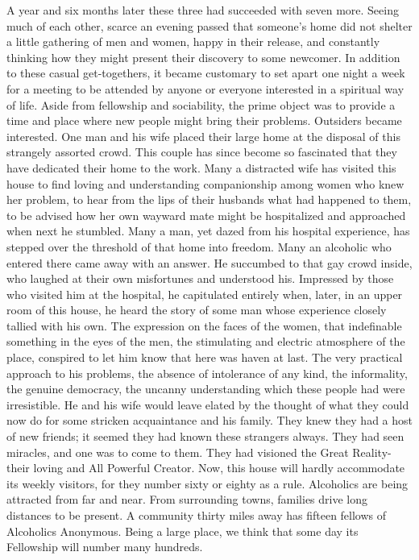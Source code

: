 \begin{biblechapter}
A year and six months later these three had succeeded with seven more.  Seeing much of each other, scarce an evening passed that someone's home did not shelter a little gathering of men and women, happy in their release, and constantly thinking how they might present their discovery to some newcomer.  In addition to these casual get-togethers, it became customary to set apart one night a week for a meeting to be attended by anyone or everyone interested in a spiritual way of life.  Aside from fellowship and sociability, the prime object was to provide a time and place where new people might bring their problems.
Outsiders became interested.  One man and his wife placed their large home at the disposal of this strangely assorted crowd.  This couple has since become so fascinated that they have dedicated their home to the work.  Many a distracted wife has visited this house to find loving and understanding companionship among women who knew her problem, to hear from the lips of their husbands what had happened to them, to be advised how her own wayward mate might be hospitalized and approached when next he stumbled.
Many a man, yet dazed from his hospital experience, has stepped over the threshold of that home into freedom.  Many an alcoholic who entered there came away with an answer.  He succumbed to that gay crowd inside, who laughed at their own misfortunes and understood his.  Impressed by those who visited him at the hospital, he capitulated entirely when, later, in an upper room of this house, he heard the story of some man whose experience closely tallied with his own.  The expression on the faces of the women, that indefinable something in the eyes of the men, the stimulating and electric atmosphere of the place, conspired to let him know that here was haven at last.
The very practical approach to his problems, the absence of intolerance of any kind, the informality, the genuine democracy, the uncanny understanding which these people had were irresistible.  He and his wife would leave elated by the thought of what they could now do for some stricken acquaintance and his family.  They knew they had a host of new friends; it seemed they had known these strangers always.  They had seen miracles, and one was to come to them.  They had visioned the Great Reality-their loving and All Powerful Creator.
Now, this house will hardly accommodate its weekly visitors, for they number sixty or eighty as a rule.  Alcoholics are being attracted from far and near.  From surrounding towns, families drive long distances to be present.  A community thirty miles away has fifteen fellows of Alcoholics Anonymous.  Being a large place, we think that some day its Fellowship will number many hundreds.

\end{biblechapter}
